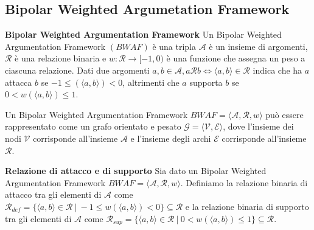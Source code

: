 
\subsection{Bipolar Weighted Argumetation Framework}

\begin{defn} \textbf{Bipolar Weighted Argumentation Framework}
Un Bipolar Weighted Argumentation Framework $(BWAF)$ è una tripla $\mathcal{A}$ è un insieme di argomenti, $\mathcal{R}$ è una relazione binaria e $w: \mathcal{R} \rightarrow [-1, 0)$ è una funzione che assegna un peso a ciascuna relazione. Dati due argomenti $a, b \in \mathcal{A}, a\mathcal{R}b \iff ⟨a,b ⟩\in \mathcal{R}$ indica che ha $a$ attacca $b$ se $-1 \leq (⟨a,b⟩) < 0$, altrimenti che $a$ supporta $b$ se $0 < w(⟨a,b⟩) \leq 1$.
\end{defn}

\bigskip
Un Bipolar Weighted Argumentation Framework $BWAF = ⟨\mathcal{A}, \mathcal{R}, w⟩$ può essere rappresentato come un grafo orientato e pesato $\mathcal{G} = ⟨\mathcal{V}, \mathcal{E}⟩$, dove l'insieme dei nodi $\mathcal{V}$ corrisponde all'insieme $\mathcal{A}$ e l'insieme degli archi $\mathcal{E}$ corrisponde all'insieme $\mathcal{R}$.

\bigskip
\begin{defn} \textbf{Relazione di attacco e di supporto}
Sia dato un Bipolar Weighted Argumentation Framework $BWAF = ⟨\mathcal{A}, \mathcal{R}, w⟩$. Definiamo la relazione binaria di attacco tra gli elementi di $\mathcal{A}$ come $\mathcal{R}_{def} = \{⟨a,b⟩ \in \mathcal{R} \ | \ -1 \leq w(⟨a, b⟩) < 0\} \subseteq \mathcal{R}$ e la relazione binaria di supporto tra gli elementi di $\mathcal{A}$ come $\mathcal{R}_{sup} = \{⟨a, b⟩ \in \mathcal{R} \ | \ 0 < w(⟨a, b⟩) \leq 1\} \subseteq \mathcal{R}$.
\end{defn}

